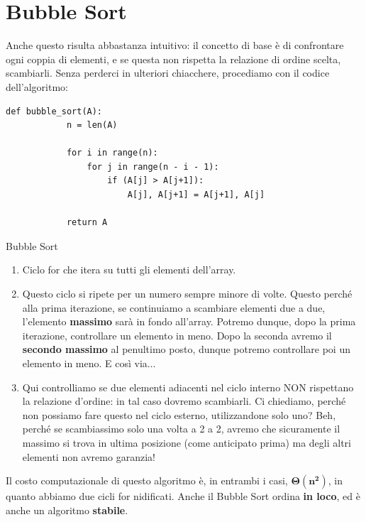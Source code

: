 \documentclass[12pt]{report}
\begin{document}
	\section{Bubble Sort}
	Anche questo risulta abbastanza intuitivo: il concetto di base è di confrontare ogni coppia di elementi, e se questa non rispetta la relazione di ordine scelta, scambiarli.
    Senza perderci in ulteriori chiacchere, procediamo con il codice dell’algoritmo:
    		
    \begin{lstlisting}[caption={Bubble Sort}]
    	def bubble_sort(A):
    		n = len(A)
    		
    		for i in range(n):
    			for j in range(n - i - 1):
    				if (A[j] > A[j+1]):
    					A[j], A[j+1] = A[j+1], A[j]
    					
    		return A
    \end{lstlisting}
    		
    \begin{algoritmo}{Bubble Sort}{}
    	
    	\begin{enumerate}
    		
    		\item Ciclo for che itera su tutti gli elementi dell’array.
    		
    		\item Questo ciclo si ripete per un numero sempre minore di volte. Questo perché alla prima iterazione, se continuiamo a scambiare elementi due a due, l’elemento \textbf{massimo} sarà in fondo all’array. Potremo dunque, dopo la prima iterazione, controllare un elemento in meno. Dopo la seconda avremo il \textbf{secondo massimo} al penultimo posto, dunque potremo controllare poi un elemento in meno. E così via$\dots$
    				
    		\item  Qui controlliamo se due elementi adiacenti nel ciclo interno NON rispettano la relazione d’ordine: in tal caso dovremo scambiarli. Ci chiediamo, perché non possiamo fare questo nel ciclo esterno, utilizzandone solo uno? Beh, perché se scambiassimo solo una volta a 2 a 2, avremo che sicuramente il massimo si trova in ultima posizione (come anticipato prima) ma degli altri elementi non avremo garanzia!
    				
    	\end{enumerate}
    			
    \end{algoritmo}
    		
    Il costo computazionale di questo algoritmo è, in entrambi i casi, $\mathbf{\Theta(n^2)}$, in quanto abbiamo due cicli for nidificati.
    Anche il Bubble Sort ordina \textbf{in loco}, ed è anche un algoritmo \textbf{stabile}.
    	
\end{document}
